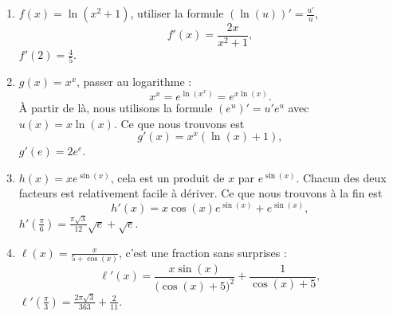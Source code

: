\begin{corrige}{1}

\begin{enumerate}

\item
$f(x)=\ln(x^2+1)$, utiliser la formule $(\ln(u))'=\frac{ u' }{ u }$,
\begin{equation}
	f'(x)=\frac{ 2x }{ x^2+1 },
\end{equation}
$f'(2)=\frac{ 4 }{ 5 }$.

\item
$g(x)=x^x$, passer au logarithme :
 \begin{equation}
	x^x= e^{\ln(x^x)}= e^{x\ln(x)}.
\end{equation}
À partir de là, nous utilisons la formule $(e^u)'=u'e^u$ avec $u(x)=x\ln(x)$. Ce que nous trouvons est
\begin{equation}
	g'(x)=x^x(\ln(x)+1),
\end{equation}
$g'(e)=2 e^{e}$.

\item
$h(x)=x e^{\sin(x)}$, cela est un produit de $x$ par $ e^{\sin(x)}$. Chacun des deux facteurs est relativement facile à dériver. Ce que nous trouvons à la fin est 
\begin{equation}
	h'(x)=x\cos(x) e^{\sin(x)}+ e^{\sin(x)},
\end{equation}
$h'(\frac{ \pi }{ 6 })=\frac{ \pi\sqrt{3} }{ 12 }\sqrt{e}+\sqrt{e}$.

\item
$\ell(x)=\frac{ x }{ 5+\cos(x) }$, c'est une fraction sans surprises :
\begin{equation}
	\ell'(x)=\frac{ x\sin(x) }{ \big( \cos(x)+5 \big)^2 }+\frac{1}{ \cos(x)+5 },
\end{equation}
$\ell'(\frac{ \pi }{ 3 })=\frac{ 2\pi\sqrt{3} }{ 363 }+\frac{ 2 }{ 11 }$.

\end{enumerate}


\end{corrige}
